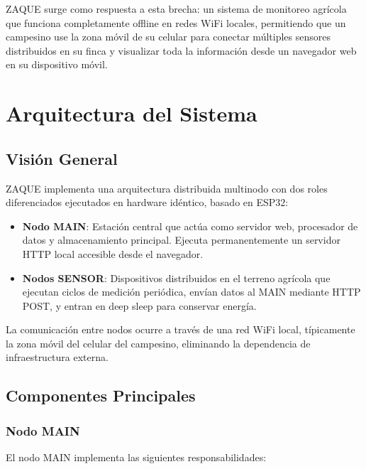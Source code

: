 \documentclass[journal]{IEEEtran}
\begin{document}
ZAQUE surge como respuesta a esta brecha: un sistema de monitoreo agrícola que funciona completamente offline en redes WiFi locales, permitiendo que un campesino use la zona móvil de su celular para conectar múltiples sensores distribuidos en su finca y visualizar toda la información desde un navegador web en su dispositivo móvil.

\section{Arquitectura del Sistema}

\subsection{Visión General}

ZAQUE implementa una arquitectura distribuida multinodo con dos roles diferenciados ejecutados en hardware idéntico, basado en ESP32:

\begin{itemize}
\item \textbf{Nodo MAIN}: Estación central que actúa como servidor web, procesador de datos y almacenamiento principal. Ejecuta permanentemente un servidor HTTP local accesible desde el navegador.
\item \textbf{Nodos SENSOR}: Dispositivos distribuidos en el terreno agrícola que ejecutan ciclos de medición periódica, envían datos al MAIN mediante HTTP POST, y entran en deep sleep para conservar energía.
\end{itemize}

La comunicación entre nodos ocurre a través de una red WiFi local, típicamente la zona móvil del celular del campesino, eliminando la dependencia de infraestructura externa.

\subsection{Componentes Principales}

\subsubsection{Nodo MAIN}

El nodo MAIN implementa las siguientes responsabilidades:
\end{document}
